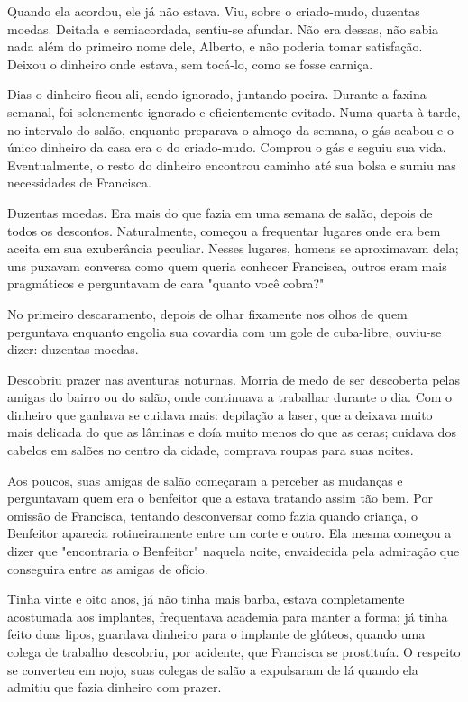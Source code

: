 \documentclass[11pt,a4paper,twoside,openany]{book}
\begin{document}
Quando ela acordou, ele já não estava. Viu, sobre o criado-mudo, duzentas moedas. Deitada e semiacordada, sentiu-se afundar. Não era dessas, não sabia nada além do primeiro nome dele, Alberto, e não poderia tomar satisfação. Deixou o dinheiro onde estava, sem tocá-lo, como se fosse carniça.

Dias o dinheiro ficou ali, sendo ignorado, juntando poeira. Durante a faxina semanal, foi solenemente ignorado e eficientemente evitado. Numa quarta à tarde, no intervalo do salão, enquanto preparava o almoço da semana, o gás acabou e o único dinheiro da casa era o do criado-mudo. Comprou o gás e seguiu sua vida. Eventualmente, o resto do dinheiro encontrou caminho até sua bolsa e sumiu nas necessidades de Francisca.

Duzentas moedas. Era mais do que fazia em uma semana de salão, depois de todos os descontos. Naturalmente, começou a frequentar lugares onde era bem aceita em sua exuberância peculiar. Nesses lugares, homens se aproximavam dela; uns puxavam conversa como quem queria conhecer Francisca, outros eram mais pragmáticos e perguntavam de cara "quanto você cobra?"

No primeiro descaramento, depois de olhar fixamente nos olhos de quem perguntava enquanto engolia sua covardia com um gole de cuba-libre, ouviu-se dizer: duzentas moedas.

Descobriu prazer nas aventuras noturnas. Morria de medo de ser descoberta pelas amigas do bairro ou do salão, onde continuava a trabalhar durante o dia. Com o dinheiro que ganhava se cuidava mais: depilação a laser, que a deixava muito mais delicada do que as lâminas e doía muito menos do que as ceras; cuidava dos cabelos em salões no centro da cidade, comprava roupas para suas noites.

Aos poucos, suas amigas de salão começaram a perceber as mudanças e perguntavam quem era o benfeitor que a estava tratando assim tão bem. Por omissão de Francisca, tentando desconversar como fazia quando criança, o Benfeitor aparecia rotineiramente entre um corte e outro. Ela mesma começou a dizer que "encontraria o Benfeitor" naquela noite, envaidecida pela admiração que conseguira entre as amigas de ofício.

Tinha vinte e oito anos, já não tinha mais barba, estava completamente acostumada aos implantes, frequentava academia para manter a forma; já tinha feito duas lipos, guardava dinheiro para o implante de glúteos, quando uma colega de trabalho descobriu, por acidente, que Francisca se prostituía. O respeito se converteu em nojo, suas colegas de salão a expulsaram de lá quando ela admitiu que fazia dinheiro com prazer.
\end{document}
